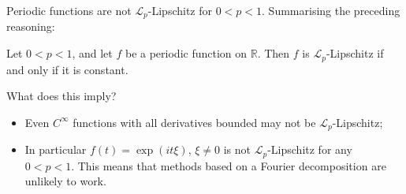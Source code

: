 \documentclass{beamer}
\numberwithin{equation}{section}
\theoremstyle{plain}
\theoremstyle{plain}
\theoremstyle{definition}
\theoremstyle{plain}
\theoremstyle{plain}
\theoremstyle{definition}
\newcommand{\Rl}{\mathbb{R}}
\newcommand{\Cplx}{\mathbb{C}}
\newcommand{\Itgr}{\mathbb{Z}}
\newcommand{\Circ}{\mathbb{T}}
\newcommand{\Lc}{\mathcal{L}}
\begin{document}
\begin{frame}{Periodic functions are not $\Lc_p$-Lipschitz for $0 < p < 1$.}
    Summarising the preceding reasoning:
    \begin{lemma}
        Let $0 < p < 1$, and let $f$ be a periodic function on $\Rl$. Then $f$ is $\Lc_p$-Lipschitz
        if and only if it is constant.
    \end{lemma}
    What does this imply?\pause
    \begin{itemize}
        \item{} Even $C^\infty$ functions with all derivatives bounded may not be $\Lc_p$-Lipschitz;\\
        \item{} In particular $f(t) = \exp(it\xi)$, $\xi\neq 0$ is not $\Lc_p$-Lipschitz for any $0 < p < 1.$ This means that methods based on a Fourier decomposition
        are unlikely to work.
    \end{itemize}
\end{frame}
%
%
%
%
\end{document}
